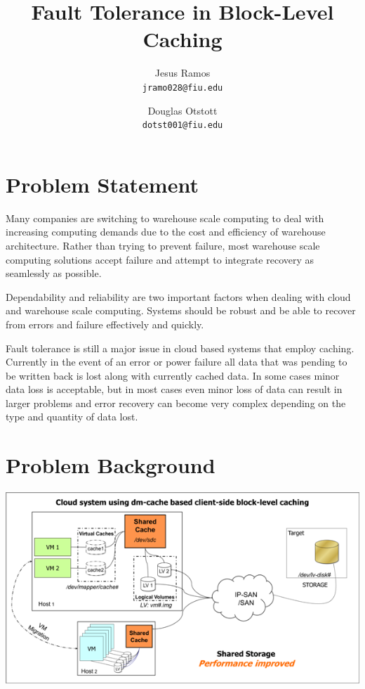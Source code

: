 \documentclass[letterpaper,12pt]{article}
\title{Fault Tolerance in Block-Level Caching}
\author{
  Jesus Ramos \\ \texttt{jramo028@fiu.edu} \and
  Douglas Otstott \\ \texttt{dotst001@fiu.edu}
}
\date{}
\begin{document}
\maketitle

\section*{Problem Statement}

Many companies are switching to warehouse scale computing to deal with
increasing computing demands due to the cost and efficiency of
warehouse architecture. Rather than trying to prevent failure, most
warehouse scale computing solutions accept failure and attempt to
integrate recovery as seamlessly as possible.

Dependability and reliability are two important factors when dealing
with cloud and warehouse scale computing. Systems should be robust and
be able to recover from errors and failure effectively and quickly.

Fault tolerance is still a major issue in cloud based systems that
employ caching. Currently in the event of an error or power failure
all data that was pending to be written back is lost along with
currently cached data. In some cases minor data loss is acceptable,
but in most cases even minor loss of data can result in larger
problems and error recovery can become very complex depending on the
type and quantity of data lost.


\section*{Problem Background}

\begin{center}
  \includegraphics{../Images/NewerImage.png}
\end{center}
\end{document}
